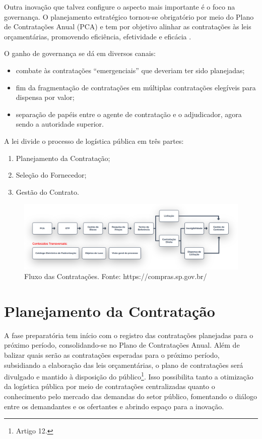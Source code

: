 Outra inovação que talvez configure o aspecto mais importante é o foco na governança. O planejamento estratégico tornou-se obrigatório por meio do Plano de Contratações Anual (PCA) e tem por objetivo alinhar as contratações às leis orçamentárias, promovendo eficiência, efetividade e eficácia \citet{TCE2022}.

O ganho de governança se dá em diversos canais:
\begin{itemize}
    \item {combate às contratações ``emergenciais'' que deveriam ter sido planejadas;}
    \item {fim da fragmentação de contratações em múltiplas contratações elegíveis para dispensa por valor;}
    \item {separação de papéis entre o agente de contratação e o adjudicador, agora sendo a autoridade superior.}
\end{itemize}

A lei divide o processo de logística pública em três partes:
\begin{enumerate}
    \item{Planejamento da Contratação;}
    \item{Seleção do Fornecedor;}
    \item{Gestão do Contrato.}
\end{enumerate}

\begin{figure}
    \centering
    \includegraphics[scale=0.26]{conteudo/imagens/fluxo.png}
    \caption{Fluxo das Contratações. Fonte: https://compras.sp.gov.br/}
    \label{fig:fluxo}
\end{figure}

\section{Planejamento da Contratação}

A fase preparatória tem início com o registro das contratações planejadas para o próximo período, consolidando-se no Plano de Contratações Anual. Além de balizar quais serão as contratações esperadas para o próximo período, subsidiando a elaboração das leis orçamentárias, o plano de contratações será divulgado e mantido à disposição do público\footnote{Artigo 12.}. Isso possibilita tanto a otimização da logística pública por meio de contratações centralizadas quanto o conhecimento pelo mercado das demandas do setor público, fomentando o diálogo entre os demandantes e os ofertantes e abrindo espaço para a inovação.

